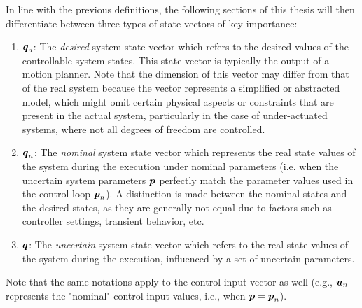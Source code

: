 In line with the previous definitions, the following sections of this thesis will then differentiate between three types of state vectors of key importance:
\begin{enumerate}
  \item $\boldsymbol{q}_d$: The \emph{desired} system state vector which refers to the desired values of the controllable system states. This state vector is typically the output of a motion planner. Note that the dimension of this vector may differ from that of the real system because the vector represents a simplified or abstracted model, which might omit certain physical aspects or constraints that are present in the actual system, particularly in the case of under-actuated systems, where not all degrees of freedom are controlled.
  \item $\boldsymbol{q}_n$: The \emph{nominal} system state vector which represents the real state values of the system during the execution under nominal parameters (i.e. when the uncertain system parameters $\boldsymbol{p}$ perfectly match the parameter values used in the control loop $\boldsymbol{p}_n$). A distinction is made between the nominal states and the desired states, as they are generally not equal due to factors such as controller settings, transient behavior, etc.
  \item $\boldsymbol{q}$: The \emph{uncertain} system state vector which refers to the real state values of the system during the execution, influenced by a set of uncertain parameters.
\end{enumerate}
Note that the same notations apply to the control input vector as well (e.g., $\boldsymbol{u}_n$ represents the "nominal" control input values, i.e., when $\boldsymbol{p}=\boldsymbol{p}_n$).

